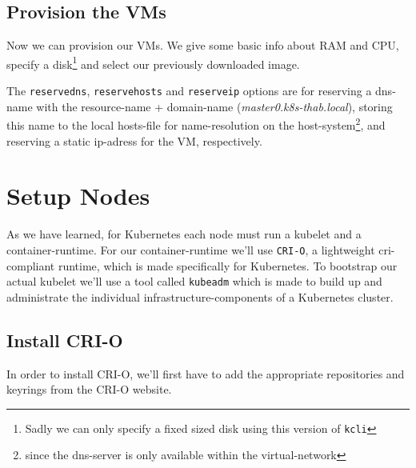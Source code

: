 \subsection{Provision the VMs}
Now we can provision our VMs. We give some basic info about RAM and CPU, specify a disk\footnote{Sadly we can only specify a fixed sized disk using this version of \texttt{kcli}} and select our previously downloaded image.

The \texttt{reservedns}, \texttt{reservehosts} and \texttt{reserveip} options are for reserving a dns-name with the resource-name + domain-name (\textit{master0.k8s-thab.local}), storing this name to the local hosts-file for name-resolution on the host-system\footnote{since the dns-server is only available within the virtual-network}, and reserving a static ip-adress for the VM, respectively. 

\section{Setup Nodes}
As we have learned, for Kubernetes each node must run a kubelet and a container-runtime. For our container-runtime we'll use \texttt{CRI-O}, a lightweight cri-compliant runtime, which is made specifically for Kubernetes.
To bootstrap our actual kubelet we'll use a tool called \texttt{kubeadm} which is made to build up and administrate the individual infrastructure-components of a Kubernetes cluster. \cite{kubeadm:2022}

\subsection{Install CRI-O}

In order to install CRI-O, we'll first have to add the appropriate repositories and keyrings from the CRI-O website.

